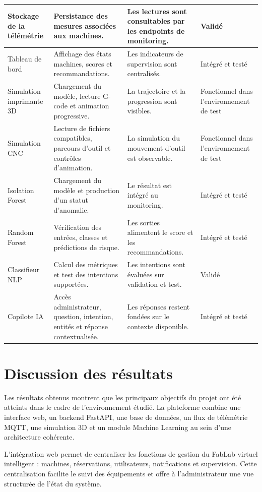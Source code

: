 \begin{table}[H]
\begin{tabular}{|>{\raggedright\arraybackslash}p{}|>{\raggedright\arraybackslash}p{}|>{\raggedright\arraybackslash}p{}|>{\raggedright\arraybackslash}p{}|}
\hline
Stockage de la télémétrie & Persistance des mesures associées aux machines. & Les lectures sont consultables par les endpoints de monitoring. & Validé \\
\hline
Tableau de bord & Affichage des états machines, scores et recommandations. & Les indicateurs de supervision sont centralisés. & Intégré et testé \\
\hline
Simulation imprimante 3D & Chargement du modèle, lecture G-code et animation progressive. & La trajectoire et la progression sont visibles. & Fonctionnel dans l'environnement de test \\
\hline
Simulation CNC & Lecture de fichiers compatibles, parcours d'outil et contrôles d'animation. & La simulation du mouvement d'outil est observable. & Fonctionnel dans l'environnement de test \\
\hline
Isolation Forest & Chargement du modèle et production d'un statut d'anomalie. & Le résultat est intégré au monitoring. & Intégré et testé \\
\hline
Random Forest & Vérification des entrées, classes et prédictions de risque. & Les sorties alimentent le score et les recommandations. & Intégré et testé \\
\hline
Classifieur NLP & Calcul des métriques et test des intentions supportées. & Les intentions sont évaluées sur validation et test. & Validé \\
\hline
Copilote IA & Accès administrateur, question, intention, entités et réponse contextualisée. & Les réponses restent fondées sur le contexte disponible. & Intégré et testé \\
\hline
\end{tabular}
\end{table}

\section{Discussion des résultats}

Les résultats obtenus montrent que les principaux objectifs du projet ont été atteints dans le cadre de l'environnement étudié. La plateforme combine une interface web, un backend FastAPI, une base de données, un flux de télémétrie MQTT, une simulation 3D et un module Machine Learning au sein d'une architecture cohérente.

L'intégration web permet de centraliser les fonctions de gestion du FabLab virtuel intelligent : machines, réservations, utilisateurs, notifications et supervision. Cette centralisation facilite le suivi des équipements et offre à l'administrateur une vue structurée de l'état du système.

